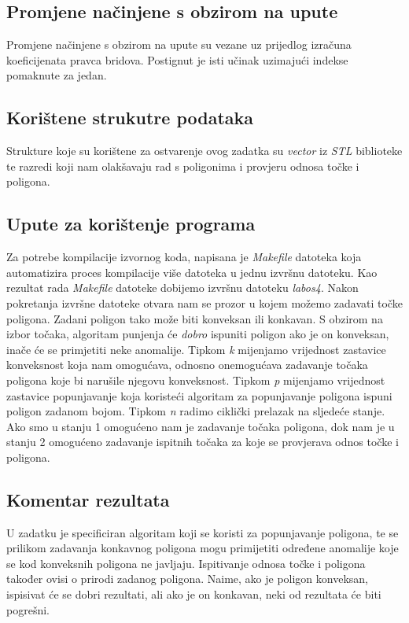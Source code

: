 \documentclass{report}
\begin{document}
\subsection{Promjene načinjene s obzirom na upute}
Promjene načinjene s obzirom na upute su vezane uz prijedlog izračuna koeficijenata pravca bridova. Postignut je isti učinak uzimajući indekse pomaknute za jedan.

\subsection{Korištene strukutre podataka}
Strukture koje su korištene za ostvarenje ovog zadatka su \textit{vector} iz \textit{STL} biblioteke te razredi koji nam olakšavaju rad s poligonima i provjeru odnosa točke i poligona.

\subsection{Upute za korištenje programa}
Za potrebe kompilacije izvornog koda, napisana je \textit{Makefile} datoteka koja automatizira proces kompilacije više datoteka u jednu izvršnu datoteku. Kao rezultat rada \textit{Makefile} datoteke dobijemo izvršnu datoteku \textit{labos4}. Nakon pokretanja izvršne datoteke otvara nam se prozor u kojem možemo zadavati točke poligona. Zadani poligon tako može biti konveksan ili konkavan. S obzirom na izbor točaka, algoritam punjenja će \textit{dobro} ispuniti poligon ako je on konveksan, inače će se primjetiti neke anomalije. Tipkom \textit{k} mijenjamo vrijednost zastavice konveksnost koja nam omogućava, odnosno onemogućava zadavanje točaka poligona koje bi narušile njegovu konveksnost. Tipkom \textit{p} mijenjamo vrijednost zastavice popunjavanje koja koristeći algoritam za popunjavanje poligona ispuni poligon zadanom bojom. Tipkom \textit{n} radimo ciklički prelazak na sljedeće stanje. Ako smo u stanju 1 omogućeno nam je zadavanje točaka poligona, dok nam je u stanju 2 omogućeno zadavanje ispitnih točaka za koje se provjerava odnos točke i poligona.

\subsection{Komentar rezultata}
U zadatku je specificiran algoritam koji se koristi za popunjavanje poligona, te se prilikom zadavanja konkavnog poligona mogu primijetiti određene anomalije koje se kod konveksnih poligona ne javljaju. Ispitivanje odnosa točke i poligona također ovisi o prirodi zadanog poligona. Naime, ako je poligon konveksan, ispisivat će se dobri rezultati, ali ako je on konkavan, neki od rezultata će biti pogrešni.
\end{document}
